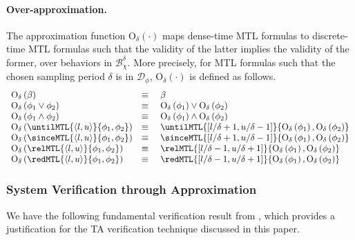 \documentclass[a4paper]{article}
\newcommand{\overap}[1]{\mathrm{O}_{\delta}\left({#1}\right)}
\newcommand{\Dcal}{\mathcal{D}}
\newcommand{\Bchi}{\mathcal{B}_{\chi}}
\theoremstyle{plain}
\theoremstyle{definition}
\begin{document}
\paragraph{Over-ap\-prox\-i\-ma\-tion.}
The approximation function $\overap{\cdot}$ maps dense-time MTL formulas to discrete-time MTL formulas such that the validity of the latter implies the validity of the former, over behaviors in $\Bchi^\delta$.
More precisely, for MTL formulas such that the chosen sampling period $\delta$ is in $\Dcal_\phi$, $\overap{\cdot}$ is defined as follows.
\begin{equation*}
  \begin{array}{lcl}
  \overap{\beta}  &  \equiv  & \   \beta  \\

  \overap{\phi_1 \vee \phi_2}  &  \equiv  & \   \overap{\phi_1} \vee \overap{\phi_2}  \\

  \overap{\phi_1 \wedge \phi_2}  &  \equiv  & \   \overap{\phi_1} \wedge \overap{\phi_2}  \\

  \overap{\untilMTL{\langle l, u \rangle}{\phi_1, \phi_2}}
                            &  \equiv  & \  \untilMTL{[l/\delta + 1, u/\delta - 1]}{\overap{\phi_1}, \overap{\phi_2}} \\

 \overap{\sinceMTL{\langle l, u \rangle}{\phi_1, \phi_2}}
                           &  \equiv  & \  \sinceMTL{[l/\delta + 1, u/\delta - 1]}{\overap{\phi_1}, \overap{\phi_2}} \\

  \overap{\relMTL{\langle l, u \rangle}{\phi_1, \phi_2}}
                            &  \equiv  & \  \relMTL{[l/\delta - 1, u/\delta + 1]}{\overap{\phi_1}, \overap{\phi_2}} \\

 \overap{\redMTL{\langle l, u \rangle}{\phi_1, \phi_2}}
                           &  \equiv  & \  \redMTL{[l/\delta - 1, u/\delta + 1]}{\overap{\phi_1}, \overap{\phi_2}}
  \end{array}
\end{equation*}





\subsubsection{System Verification through Approximation}
We have the following fundamental verification result from \cite{FPR08-FM08}, which provides a justification for the TA verification technique discussed in this paper.
\end{document}
